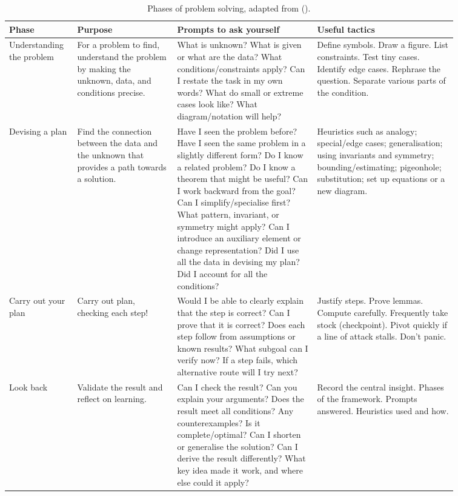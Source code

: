 \documentclass[
  a4paper,
  DIV=11,
  numbers=noendperiod,
  oneside]{scrreprt}
\begin{document}
\begin{landscape}

\begin{longtable}[t]{p{0.1\linewidth}p{0.2\linewidth}p{0.28\linewidth}p{0.28\linewidth}}

\caption{\label{tbl-phases}Phases of problem solving, adapted from
().}

\tabularnewline

\toprule
Phase & Purpose & Prompts to ask yourself & Useful tactics\\
\midrule
Understanding the problem & For a problem to find, understand the problem by making the unknown, data, and conditions precise. & What is unknown? What is given or what are the data? What conditions/constraints apply? Can I restate the task in my own words? What do small or extreme cases look like? What diagram/notation will help? & Define symbols. Draw a figure. List constraints. Test tiny cases. Identify edge cases. Rephrase the question. Separate various parts of the condition.\\
Devising a plan & Find the connection between the data and the unknown that provides a path towards a solution. & Have I seen the problem before? Have I seen the same problem in a slightly different form? Do I know a related problem? Do I know a theorem that might be useful? Can I work backward from the goal? Can I simplify/specialise first? What pattern, invariant, or symmetry might apply? Can I introduce an auxiliary element or change representation? Did I use all the data in devising my plan? Did I account for all the conditions? & Heuristics such as analogy; special/edge cases; generalisation; using invariants and symmetry; bounding/estimating; pigeonhole; substitution; set up equations or a new diagram.\\
Carry out your plan & Carry out plan, checking each step! & Would I be able to clearly explain that the step is correct? Can I prove that it is correct? Does each step follow from assumptions or known results? What subgoal can I verify now? If a step fails, which alternative route will I try next? & Justify steps. Prove lemmas. Compute carefully. Frequently take stock (checkpoint). Pivot quickly if a line of attack stalls. Don't panic.\\
Look back & Validate the result and reflect on learning. & Can I check the result? Can you explain your arguments? Does the result meet all conditions? Any counterexamples? Is it complete/optimal? Can I shorten or generalise the solution? Can I derive the result differently? What key idea made it work, and where else could it apply? & Record the central insight. Phases of the framework. Prompts answered. Heuristics used and how.\\
\bottomrule

\end{longtable}

\end{landscape}
\end{document}
